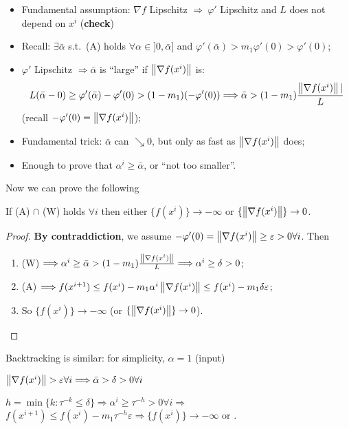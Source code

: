 \documentclass[computational_mathematics.tex]{subfiles}
\begin{document}
\begin{itemize}
 \item Fundamental assumption: $\nabla f$ Lipschitz $\Longrightarrow ~ \varphi'$ Lipschitz and $L$ does not depend on $x^i$ ({\bf check})
 \item Recall: $\exists \bar{\alpha}$ s.t.~(A) holds $\forall \alpha \in ]0, \bar{\alpha}]$ and $\varphi'(\bar{\alpha}) > m_1 \varphi'(0) > \varphi'(0)$;
 \item $\varphi'$ Lipschitz $\Longrightarrow \bar{\alpha}$ is ``large'' if $\left\lVert\nabla f(x^i)\right\rVert$ is: 
   \[
     L(\bar{\alpha} - 0) \geq \varphi'(\bar{\alpha}) - \varphi'(0)
        > (1 - m_1) (- \varphi'(0)) \Longrightarrow 
        \bar{\alpha} > (1 - m_1) \frac{\left\lVert\nabla f(x^i)\right\rVert|}{L}
  \]
       (recall $- \varphi'(0) = \left\lVert\nabla f(x^i)\right\rVert$);
 \item Fundamental trick: $\bar{\alpha}$ can $\searrow 0$, but only as fast as $\left\lVert\nabla f(x^i)\right\rVert$ does;
 \item Enough to prove that $\alpha^i \geq \bar{\alpha}$, or ``not too smaller''.
\end{itemize}

Now we can prove the following

\begin{theorem}
  If (A) $\cap$ (W) holds $\forall i$ then either $\{f(x^i)\} \to -\infty$ or $ \{\left\lVert\nabla f(x^i)\right\rVert\} \to 0$. 
\end{theorem}

\begin{proof}
  \textbf{By contraddiction}, we assume $- \varphi'(0) = \left\lVert\nabla f(x^i)\right\rVert \geq \varepsilon > 0 \forall i$. Then
  \begin{enumerate}
    \item (W) $\Longrightarrow \alpha^i \geq \bar{\alpha} > (1 - m_1) \frac{\left\lVert\nabla f(x^i)\right\rVert}{L} \Longrightarrow \alpha^i \geq \delta > 0$;
    \item (A) $\Longrightarrow f(x^{i+1}) \leq f(x^i) - m_1 \alpha^i \left\lVert\nabla f(x^i)\right\rVert \leq f(x^i) - m_1 \delta \varepsilon$;
    \item So $\{f(x^i)\} \to -\infty$ (or $ \{\left\lVert\nabla f(x^i)\right\rVert\} \to 0$).
  \end{enumerate}
\end{proof}

Backtracking is similar: for simplicity, $\alpha = 1$ (input)

      $\left\lVert\nabla f(x^i)\right\rVert > \varepsilon \forall i \Longrightarrow \bar{\alpha} > \delta > 0 \forall i$

      $h = \min \{k : \tau^{-k} \leq \delta\} \Longrightarrow \alpha^i \geq \tau^{-h} > 0 \forall i \Longrightarrow$ $f(x^{i+1}) \leq f(x^i) - m_1 \tau^{-h} \varepsilon \Longrightarrow \{f(x^i)\} \to -\infty$ or \faFlash.
\end{document}
